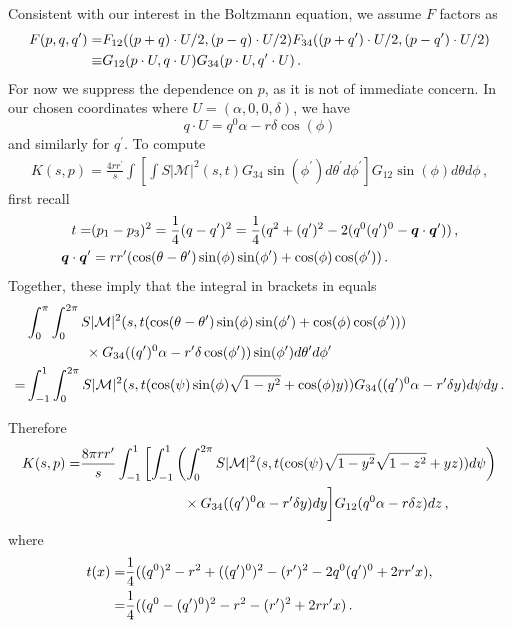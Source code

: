 Consistent with our interest in the Boltzmann equation, we assume $F$ factors as
\begin{align}
 F(p,q,q^{\prime})=&F_{12}((p+q)\cdot U/2,(p-q)\cdot U/2)F_{34}((p+q^{\prime})\cdot U/2,(p-q^{\prime})\cdot U/2)\\
\equiv &G_{12}(p\cdot U,q\cdot U)G_{34}(p\cdot U,q^{\prime}\cdot U)\,.\notag
\end{align}
For now we suppress the dependence on $p$, as it is not of immediate concern. In our chosen coordinates where $U=(\alpha,0,0,\delta)$, we have
\begin{equation}
q\cdot U=q^0\alpha-r\delta\cos(\phi)
\end{equation}
and similarly for $q^{\prime}$.
To compute
\begin{align}\label{KAngular1}
K(s,p)=\frac{4rr^{\prime}}{s}\int \left[\int S |\mathcal{M}|^2 (s,t) G_{34}\sin(\phi^{\prime})d\theta^{\prime} d\phi^{\prime}\right] G_{12}\sin(\phi)d\theta d\phi\,,
\end{align}
first recall 
\begin{align}
t=&(p_1-p_3)^2=\frac{1}{4}(q- q^{\prime})^2=\frac{1}{4}(q^2+(q^{\prime})^2-2(q^0(q^{\prime})^0-\vec{q}\cdot \vec{q}^{\prime}))\,,\\
\vec{q}\cdot\vec{q}^{\prime}&=rr^{\prime}(\cos(\theta-\theta^{\prime})\sin(\phi)\sin(\phi^{\prime})+\cos(\phi)\cos(\phi^{\prime}))\,.\notag
\end{align}
Together, these imply that the integral in brackets in   equals
\begin{align}
&\int_0^\pi\int_0^{2\pi} S |\mathcal{M}|^2 (s,t(\cos(\theta-\theta^{\prime})\sin(\phi)\sin(\phi^{\prime})+\cos(\phi)\cos(\phi^{\prime})))\\
&\hspace{15mm}\times G_{34}((q^{\prime})^0\alpha-r^{\prime}\delta\cos(\phi^{\prime}))\sin(\phi^{\prime})d\theta^{\prime} d\phi^{\prime}\notag\\
=&\int_{-1}^1\int_0^{2\pi} S |\mathcal{M}|^2 (s,t(\cos(\psi)\sin(\phi)\sqrt{1-y^2}+\cos(\phi)y)) G_{34}((q^{\prime})^0\alpha-r^{\prime}\delta y)d\psi dy\,.\notag
\end{align}


Therefore 
\begin{align}
K(s,p)=&\frac{8\pi rr^{\prime}}{s}\int_{-1}^1 \left[\int_{-1}^1\left(\int_0^{2\pi} S |\mathcal{M}|^2 (s,t(\cos(\psi)\sqrt{1-y^2}\sqrt{1-z^2}+yz))d\psi\right)\right.\\
&\hspace{26mm}\times G_{34}((q^{\prime})^0\alpha-r^{\prime}\delta y) dy\bigg] G_{12}(q^0\alpha-r\delta z)dz\,,\notag
\end{align}
where
\begin{align}
t(x)=&\frac{1}{4}((q^0)^2-r^2+((q^{\prime})^0)^2-(r^{\prime})^2-2q^0(q^{\prime})^0+2rr^{\prime}x),\\
=&\frac{1}{4}((q^0-(q^{\prime})^0)^2-r^2-(r^{\prime})^2+2rr^{\prime}x)\,.\notag
\end{align}

